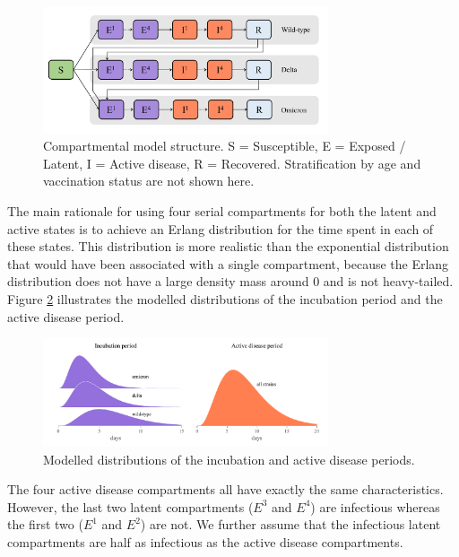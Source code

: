 \begin{figure}[ht]
    \begin{center}
    \includegraphics[width=0.75\textwidth]{../../tex_descriptions/models/sm_covid/sm_covid_se4i4r.pdf}
    \end{center}
    \caption{Compartmental model structure. 
    S = Susceptible, E = Exposed / Latent, I = Active disease, R = Recovered.
    Stratification by age and vaccination status are not shown here.
    } 
    \label{fig:se4i4r}
\end{figure}

The main rationale for using four serial compartments for both the latent and active states is to achieve an Erlang distribution for the time spent in each of these states. This distribution is more realistic than
the exponential distribution that would have been associated with a single compartment, because the Erlang distribution does not have a large density mass around 0 and is not heavy-tailed. Figure \ref{fig:sojourn} 
illustrates the modelled distributions of the incubation period and the active disease period. 

\begin{figure}[ht]
    \begin{center}
    \includegraphics[width=0.75\textwidth]{../../tex_descriptions/models/sm_covid/sojourns.pdf}
    \end{center}
    \caption{Modelled distributions of the incubation and active disease periods.
    } 
    \label{fig:sojourn}
\end{figure}

The four active disease compartments all have exactly the same characteristics. However, the last two latent compartments ($E^3$ and $E^4$) are infectious whereas the first two ($E^1$ and $E^2$) are not. We further assume that 
the infectious latent compartments are half as infectious as the active disease compartments.

